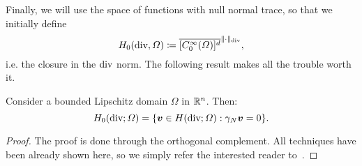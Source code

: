 Finally, we will use the space of functions with null normal trace, so that we initially define
\begin{equation}\label{eq:def-H0div-closure}
H_0(\operatorname{\text{div}}, \Omega) \coloneqq \overline{[C_0^\infty(\Omega)]^d}^{\|\cdot \|_{\operatorname{\text{div}}}},
\end{equation}
i.e. the closure in the $\operatorname{\text{div}}$ norm. The following result makes all the trouble worth it. 
\begin{theorem}
Consider a bounded Lipschitz domain $\Omega$ in $\mathbb{R}^n$. Then: 
\begin{equation}\label{def-H0div-kernel}
H_0(\dive;\Omega) = \{\vec v\in H(\dive;\Omega): \gamma_N \vec v = 0 \}.
\end{equation}
\begin{proof}
    The proof is done through the orthogonal complement. All techniques have been already shown here, so we simply refer the interested reader to~\cite[Thm 3.25]{monk2003finite}.
\end{proof}
\end{theorem}

